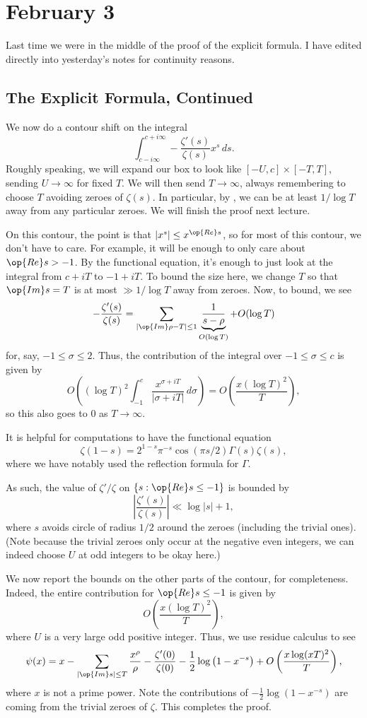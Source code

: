 \documentclass[../notes.tex]{subfiles}
\begin{document}
\section{February 3}

Last time we were in the middle of the proof of the explicit formula. I have edited directly into yesterday's notes for continuity reasons.

\subsection{The Explicit Formula, Continued}
We now do a contour shift on the integral
\[\int_{c-i\infty}^{c+i\infty}-\frac{\zeta'(s)}{\zeta(s)}x^s\,ds.\]
Roughly speaking, we will expand our box to look like $[-U,c]\times[-T,T]$, sending $U\to\infty$ for fixed $T$. We will then send $T\to\infty$, always remembering to choose $T$ avoiding zeroes of $\zeta(s)$. In particular, by , we can be at least $1/\log T$ away from any particular zeroes. We will finish the proof next lecture.

On this contour, the point is that $|x^s|\le x^{\op{Re}s}$, so for most of this contour, we don't have to care. For example, it will be enough to only care about $\op{Re}s>-1$. By the functional equation, it's enough to just look at the integral from $c+iT$ to $-1+iT$. To bound the size here, we change $T$ so that $\op{Im}s=T$ is at most $\gg1/\log T$ away from zeroes. Now, to bound, we see
\[-\frac{\zeta'(s)}{\zeta(s)}=\sum_{|\op{Im}\rho-T|\le1}\underbrace{\frac1{s-\rho}}_{O(\log T)}+O(\log T)\]
for, say, $-1\le\sigma\le2$. Thus, the contribution of the integral over $-1\le\sigma\le c$ is given by
\[O\left((\log T)^2\int_{-1}^c\frac{x^{\sigma+iT}}{|\sigma+iT|}\,d\sigma\right)=O\left(\frac{x(\log T)^2}T\right),\]
so this also goes to $0$ as $T\to\infty$.
\begin{remark}
	It is helpful for computations to have the functional equation
	\[\zeta(1-s)=2^{1-s}\pi^{-s}\cos(\pi s/2)\Gamma(s)\zeta(s),\]
	where we have notably used the reflection formula for $\Gamma$.
\end{remark}
As such, the value of $\zeta'/\zeta$ on $\{s:\op{Re}s\le-1\}$ is bounded by
\[\left|\frac{\zeta'(s)}{\zeta(s)}\right|\ll\log|s|+1,\]
where $s$ avoids circle of radius $1/2$ around the zeroes (including the trivial ones). (Note because the trivial zeroes only occur at the negative even integers, we can indeed choose $U$ at odd integers to be okay here.)

We now report the bounds on the other parts of the contour, for completeness. Indeed, the entire contribution for $\op{Re}s\le-1$ is given by
\[O\left(\frac{x(\log T)^2}T\right),\]
where $U$ is a very large odd positive integer. Thus, we use residue calculus to see
\[\psi(x)=x-\sum_{|\op{Im}s|\le T}\frac{x^\rho}\rho-\frac{\zeta'(0)}{\zeta(0)}-\frac12\log\left(1-x^{-s}\right)+O\left(\frac{x\log(xT)^2}T\right),\]
where $x$ is not a prime power. Note the contributions of $-\frac12\log\left(1-x^{-s}\right)$ are coming from the trivial zeroes of $\zeta$. This completes the proof.
\end{document}
